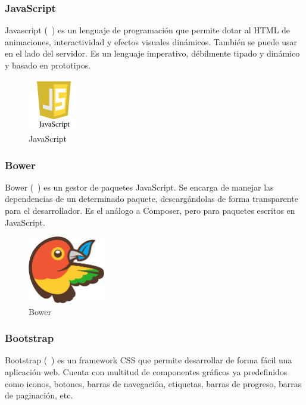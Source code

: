 \subsubsection*{JavaScript}
Javascript (~\cite{javascript}) es un lenguaje de programación que permite dotar al HTML de animaciones, interactividad y efectos visuales dinámicos. También se puede usar en el lado del servidor. Es un lenguaje imperativo, débilmente tipado y dinámico y basado en prototipos.

\begin{figure}[tbh]
\centering
\label{fig:javascript}
\includegraphics[width=0.2\textwidth]{imagenes/javascript}
\caption{JavaScript}
\end{figure}

\subsubsection*{Bower}
Bower (~\cite{bower}) es un gestor de paquetes JavaScript. Se encarga de manejar las dependencias de un determinado paquete, descargándolas de forma transparente para el desarrollador. Es el análogo a Composer, pero para paquetes escritos en JavaScript.

\begin{figure}[tbh]
\centering
\label{fig:bower}
\includegraphics[width=0.3\textwidth]{imagenes/bower}
\caption{Bower}
\end{figure}

\subsubsection*{Bootstrap}
Bootstrap (~\cite{bootstrap}) es un framework CSS que permite desarrollar de forma fácil una aplicación web. Cuenta con multitud de componentes gráficos ya predefinidos como iconos, botones, barras de navegación, etiquetas, barras de progreso, barras de paginación, etc.

